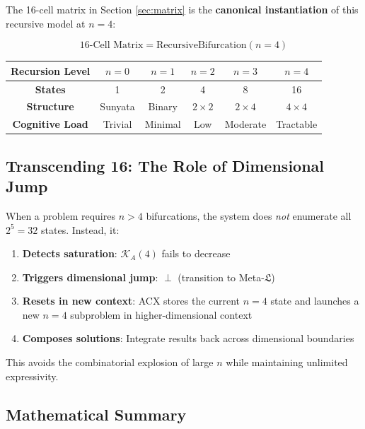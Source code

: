 \documentclass[12pt,a4paper]{article}
\theoremstyle{definition}
\newcommand{\letheia}{\mathfrak{L}}
\newcommand{\kal}{\mathcal{K}_A}
\begin{document}
The 16-cell matrix in Section \ref{sec:matrix} is the \textbf{canonical instantiation} of this recursive model at $n=4$:

\begin{equation}
\text{16-Cell Matrix} = \text{RecursiveBifurcation}(n=4)
\end{equation}

\begin{table}[h]
\centering
\small
\begin{tabular}{|c|c|c|c|c|c|}
\hline
\textbf{Recursion Level} & $n=0$ & $n=1$ & $n=2$ & $n=3$ & $n=4$ \\
\hline
\textbf{States} & 1 & 2 & 4 & 8 & 16 \\
\hline
\textbf{Structure} & Sunyata & Binary & $2 \times 2$ & $2 \times 4$ & $4 \times 4$ \\
\hline
\textbf{Cognitive Load} & Trivial & Minimal & Low & Moderate & Tractable \\
\hline
\end{tabular}
\end{table}

\subsection{Transcending 16: The Role of Dimensional Jump}

When a problem requires $n > 4$ bifurcations, the system does \textit{not} enumerate all $2^5 = 32$ states. Instead, it:

\begin{enumerate}
    \item \textbf{Detects saturation}: $\kal(4)$ fails to decrease
    \item \textbf{Triggers dimensional jump}: $\perp$ (transition to Meta-$\letheia$)
    \item \textbf{Resets in new context}: ACX stores the current $n=4$ state and launches a new $n=4$ subproblem in higher-dimensional context
    \item \textbf{Composes solutions}: Integrate results back across dimensional boundaries
\end{enumerate}

This avoids the combinatorial explosion of large $n$ while maintaining unlimited expressivity.

\subsection{Mathematical Summary}
\end{document}

